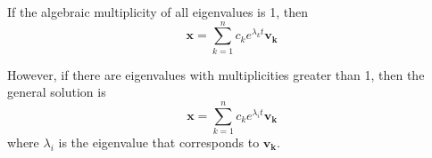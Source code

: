 \documentclass[11pt]{article}
\begin{document}
	If the algebraic multiplicity of all eigenvalues is 1, then
	\begin{equation}
		\mathbf{x} = \sum_{k=1}^n c_ke^{\lambda_k t} \mathbf{v_k}
	\end{equation}
	
	However, if there are eigenvalues with multiplicities greater than 1, then the general solution is
	\begin{equation}
		\mathbf{x} = \sum_{k=1}^n c_ke^{\lambda_i t} \mathbf{v_k}
	\end{equation}
	where $\lambda_i$ is the eigenvalue that corresponds to $\mathbf{v_k}$.

%		
%		


\end{document}
